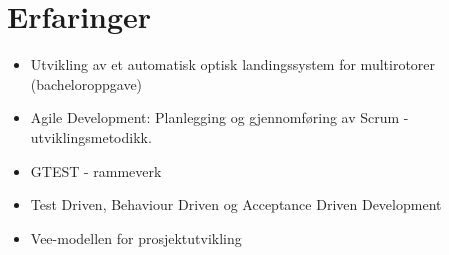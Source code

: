 \documentclass[]{friggeri-cv}
\begin{document}
\section{Erfaringer}
\begin{itemize}
    \item Utvikling av et automatisk optisk landingssystem for multirotorer (bacheloroppgave)
    \item Agile Development: Planlegging og gjennomføring av Scrum - utviklingsmetodikk.
    \item GTEST - rammeverk
    \item Test Driven, Behaviour Driven og Acceptance Driven Development
    \item Vee-modellen for prosjektutvikling
	
\end{itemize}
\end{document}
